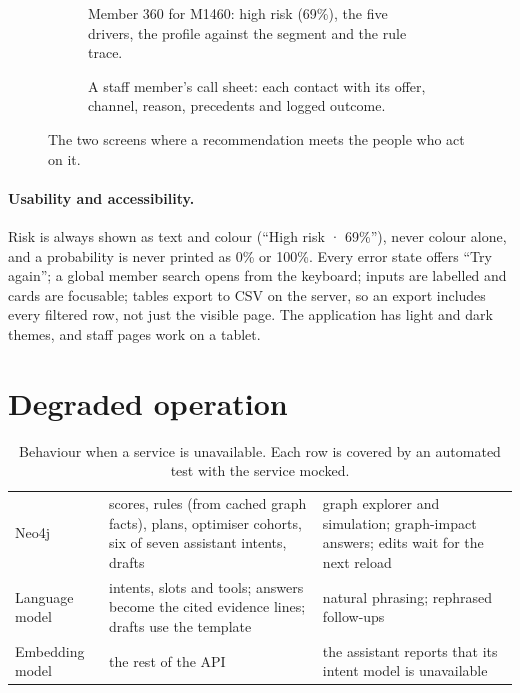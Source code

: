 \begin{figure}[tb]
  \centering
  \begin{subfigure}[t]{0.495\linewidth}
    \caption{Member 360 for M1460: high risk (69\%), the five drivers, the profile against the segment and the rule trace.}
  \end{subfigure}\hfill
  \begin{subfigure}[t]{0.495\linewidth}
    \caption{A staff member's call sheet: each contact with its offer, channel, reason, precedents and logged outcome.}
  \end{subfigure}
  \caption{The two screens where a recommendation meets the people who act on it.}
  \label{fig:m360}
\end{figure}

\paragraph{Usability and accessibility.} Risk is always shown as text and colour (\enquote{High risk · 69\%}), never colour alone, and a probability is never printed as 0\% or 100\%. Every error state offers \enquote{Try again}; a global member search opens from the keyboard; inputs are labelled and cards are focusable; tables export to CSV on the server, so an export includes every filtered row, not just the visible page. The application has light and dark themes, and staff pages work on a tablet.

\section{Degraded operation}

\begin{table}[tb]
  \caption{Behaviour when a service is unavailable. Each row is covered by an automated test with the service mocked.}
  \label{tab:degrade}
  \begin{tabularx}{\linewidth}{@{}l L L@{}}
    \toprule
     &  &  \\
    \midrule
    Neo4j & scores, rules (from cached graph facts), plans, optimiser cohorts, six of seven assistant intents, drafts & graph explorer and simulation; graph-impact answers; edits wait for the next reload \\
    Language model & intents, slots and tools; answers become the cited evidence lines; drafts use the template & natural phrasing; rephrased follow-ups \\
    Embedding model & the rest of the API & the assistant reports that its intent model is unavailable \\
    \bottomrule
  \end{tabularx}
\end{table}

